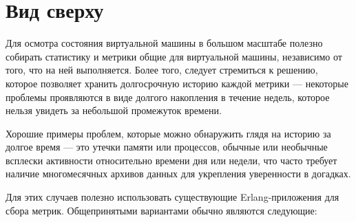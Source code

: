 \documentclass[11pt, oneside]{book}   	%
\begin{document}
\section{Вид сверху}
\label{sec:global-view}

Для осмотра состояния виртуальной машины в большом масштабе полезно собирать статистику и метрики общие для виртуальной машины, независимо от того, что на ней выполняется. Более того, следует стремиться к решению, которое позволяет хранить долгосрочную историю каждой метрики --- некоторые проблемы проявляются в виде долгого накопления в течение недель, которое нельзя увидеть за небольшой промежуток времени.

Хорошие примеры проблем, которые можно обнаружить глядя на историю за долгое время --- это утечки памяти или процессов, обычные или необычные всплески активности относительно времени дня или недели, что часто требует наличие многомесячных архивов данных для укрепления уверенности в догадках.

Для этих случаев полезно использовать существующие Erlang-приложения для сбора метрик. Общепринятыми вариантами обычно являются следующие:
\end{document}
